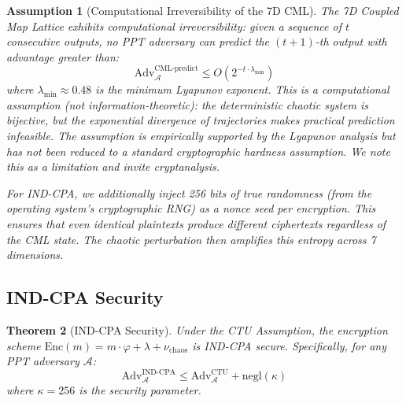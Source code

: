 \documentclass[11pt,a4paper]{article}
\newtheorem{theorem}{Theorem}[section]
\newtheorem{assumption}[theorem]{Assumption}
\begin{document}
\begin{assumption}[Computational Irreversibility of the 7D CML]
The 7D Coupled Map Lattice exhibits \textit{computational irreversibility}: given a sequence of $t$ consecutive outputs, no PPT adversary can predict the $(t+1)$-th output with advantage greater than:
\begin{equation}
    \text{Adv}^{\text{CML-predict}}_{\mathcal{A}} \leq O(2^{-t \cdot \lambda_{\min}})
\end{equation}
where $\lambda_{\min} \approx 0.48$ is the minimum Lyapunov exponent. This is a \textit{computational} assumption (not information-theoretic): the deterministic chaotic system is bijective, but the exponential divergence of trajectories makes practical prediction infeasible. The assumption is empirically supported by the Lyapunov analysis but has not been reduced to a standard cryptographic hardness assumption. We note this as a limitation and invite cryptanalysis.

For IND-CPA, we additionally inject 256 bits of true randomness (from the operating system's cryptographic RNG) as a nonce seed per encryption. This ensures that even identical plaintexts produce different ciphertexts regardless of the CML state. The chaotic perturbation then amplifies this entropy across 7 dimensions.
\end{assumption}

\subsection{IND-CPA Security}

\begin{theorem}[IND-CPA Security]
Under the CTU Assumption, the encryption scheme $\text{Enc}(m) = m \cdot \varphi + \lambda + \nu_{\text{chaos}}$ is IND-CPA secure. Specifically, for any PPT adversary $\mathcal{A}$:
\begin{equation}
    \text{Adv}^{\text{IND-CPA}}_{\mathcal{A}} \leq \text{Adv}^{\text{CTU}}_{\mathcal{A}} + \text{negl}(\kappa)
\end{equation}
where $\kappa = 256$ is the security parameter.
\end{theorem}
\end{document}
